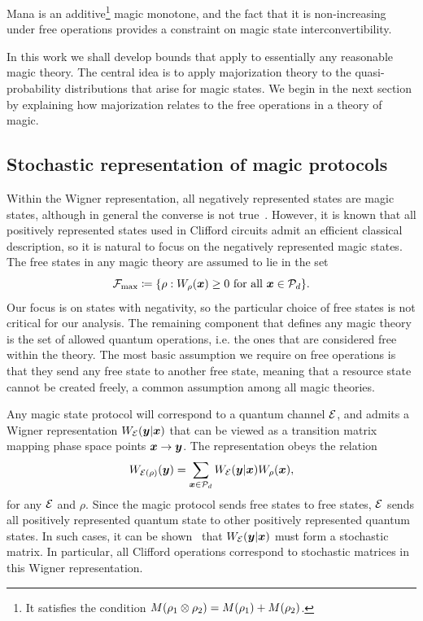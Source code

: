 \documentclass[pra,
aps,
twocolumn,
superscriptaddress,
groupedaddress,
nofootinbib,
reprint
]{revtex4-1}
\begin{document}
Mana is an additive\footnote{It satisfies the condition ${M(\rho_1 \otimes \rho_2)} = {M(\rho_1)} + {M(\rho_2)}$.} magic monotone, and the fact that it is non-increasing under free operations provides a constraint on magic state interconvertibility.

In this work we shall develop bounds that apply to essentially any reasonable magic theory. The central idea is to apply majorization theory to the quasi-probability distributions that arise for magic states. We begin in the next section by explaining how majorization relates to the free operations in a theory of magic.



\subsection{Stochastic representation of magic protocols}
\label{sec:struc}

Within the Wigner representation, all negatively represented states are magic states, although in general the converse is not true~\cite{cit:campbell}. However, it is known that all positively represented states used in Clifford circuits admit an efficient classical description, so it is natural to focus on the negatively represented magic states. The free states in any magic theory are assumed to lie in the set
\begin{equation}
    \Fmax \coloneqq \{ \rho: \W[\bmx]{\rho} \geq 0 \text{ for all } \bmx \in \cal{P}_d\}.
\end{equation}
Our focus is on states with negativity, so the particular choice of free states is not critical for our analysis. The remaining component that defines any magic theory is the set of allowed quantum operations, i.e. the ones that are considered free within the theory. The most basic assumption we require on free operations is that they send any free state to another free state, meaning that a resource state cannot be created freely, a common assumption among all magic theories.

Any magic state protocol will correspond to a quantum channel ${\mathcal E}$, and admits a Wigner representation $W_{{\mathcal E}}( \boldsymbol{y} | \boldsymbol{x})$ that can be viewed as a transition matrix mapping phase space points $\boldsymbol{x} \rightarrow \boldsymbol{y}$. The representation obeys the relation 
\begin{equation}
	W_{{\mathcal E}(\rho)} (\boldsymbol{y}) = \sum_{\boldsymbol{x} \in {\mathcal P}_d} W_{{\mathcal E}}( \boldsymbol{y} | \boldsymbol{x}) W_\rho(\boldsymbol{x}),
\end{equation}
for any ${\mathcal E}$ and $\rho$. Since the magic protocol sends free states to free states, ${\mathcal E}$ sends all positively represented quantum state to other positively represented quantum states. In such cases, it can be shown~\cite{Wang_2019} that $W_{{\mathcal E}}(\boldsymbol{y} |\boldsymbol{x})$ must form a stochastic matrix. In particular, all Clifford operations correspond to stochastic matrices in this Wigner representation. 
\end{document}
